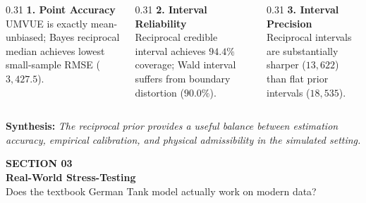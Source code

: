 \documentclass[aspectratio=169,10pt]{beamer}
\begin{document}
\begin{frame}[c]
  \begin{columns}[t,onlytextwidth]
    \begin{column}{0.31\textwidth}
      {\small \textbf{\color{headernavy} 1. Point Accuracy}}\\[0.02cm]
      {\scriptsize UMVUE is exactly mean-unbiased; Bayes reciprocal median achieves lowest small-sample RMSE ($3,427.5$).}
    \end{column}
    
    \begin{column}{0.31\textwidth}
      {\small \textbf{\color{headernavy} 2. Interval Reliability}}\\[0.02cm]
      {\scriptsize Reciprocal credible interval achieves $94.4\%$ coverage; Wald interval suffers from boundary distortion ($90.0\%$).}
    \end{column}
    
    \begin{column}{0.31\textwidth}
      {\small \textbf{\color{headernavy} 3. Interval Precision}}\\[0.02cm]
      {\scriptsize Reciprocal intervals are substantially sharper ($13,622$) than flat prior intervals ($18,535$).}
    \end{column}
  \end{columns}
  
  \vspace{0.15cm}
  \begin{center}
    {\footnotesize \textbf{\color{headernavy} Synthesis: } \textit{The reciprocal prior provides a useful balance between estimation accuracy, empirical calibration, and physical admissibility in the simulated setting.}}
  \end{center}
\end{frame}

{
\begin{frame}[c,plain]
  \centering
  {\scriptsize \textbf{\color{accentcyan} SECTION 03}}\\[0.25cm]
  {\LARGE \textbf{\color{white} Real-World Stress-Testing}}\\[0.35cm]
  {\small \color{white!80} Does the textbook German Tank model actually work on modern data?}\\[0.50cm]
  
  \setlength{\fboxrule}{1pt}
\end{frame}
}
\end{document}
